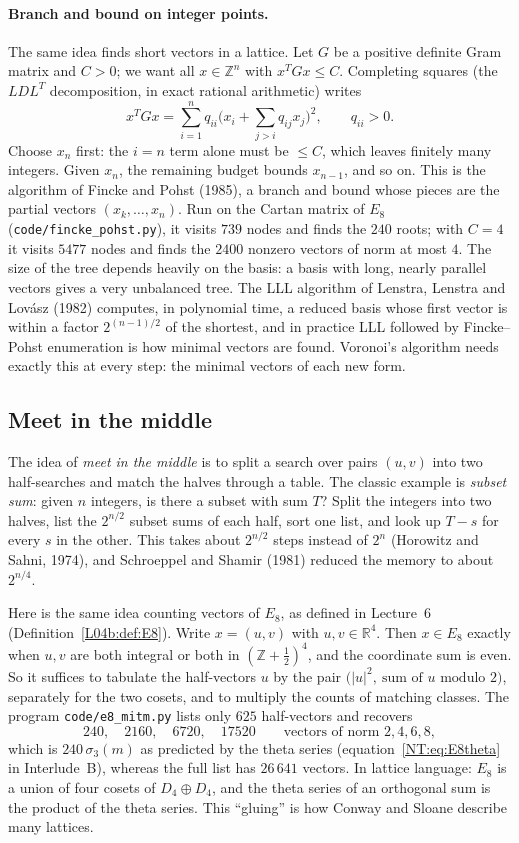\documentclass[11pt,openany]{book}
\theoremstyle{plain}
\theoremstyle{definition}
\theoremstyle{remark}
\newcommand{\R}{\mathbb{R}}
\newcommand{\Z}{\mathbb{Z}}
\newcommand{\abs}[1]{\left\lvert #1 \right\rvert}
\begin{document}
\paragraph{Branch and bound on integer points.} The same idea finds short vectors in a lattice. Let $G$ be
a positive definite Gram matrix and $C>0$; we want all $x\in\Z^n$ with $x^TGx\le C$. Completing squares
(the $LDL^T$ decomposition, in exact rational arithmetic) writes
\[
  x^TGx=\sum_{i=1}^nq_{ii}\Big(x_i+\sum_{j>i}q_{ij}x_j\Big)^2,\qquad q_{ii}>0 .
\]
Choose $x_n$ first: the $i=n$ term alone must be $\le C$, which leaves finitely many integers. Given
$x_n$, the remaining budget bounds $x_{n-1}$, and so on. This is the algorithm of Fincke and Pohst
(1985), a branch and bound whose pieces are the partial vectors $(x_k,\dots,x_n)$. Run on the Cartan
matrix of $E_8$ (\texttt{code/fincke\_pohst.py}), it visits $739$ nodes and finds the $240$ roots; with
$C=4$ it visits $5477$ nodes and finds the $2400$ nonzero vectors of norm at most $4$. The size of the
tree depends heavily on the basis: a basis with long, nearly parallel vectors gives a very unbalanced
tree. The LLL algorithm of Lenstra, Lenstra and Lov\'asz (1982) computes, in polynomial time, a reduced
basis whose first vector is within a factor $2^{(n-1)/2}$ of the shortest, and in practice LLL followed by
Fincke--Pohst enumeration is how minimal vectors are found. Voronoi's algorithm needs exactly this at
every step: the minimal vectors of each new form.

\subsection{Meet in the middle}
The idea of \emph{meet in the middle} is to split a search over pairs $(u,v)$ into two half-searches and
match the halves through a table. The classic example is \emph{subset sum}: given $n$ integers, is there
a subset with sum $T$? Split the integers into two halves, list the $2^{n/2}$ subset sums of each half, sort
one list, and look up $T-s$ for every $s$ in the other. This takes about $2^{n/2}$ steps instead of $2^n$
(Horowitz and Sahni, 1974), and Schroeppel and Shamir (1981) reduced the memory to about $2^{n/4}$.

Here is the same idea counting vectors of $E_8$, as defined in Lecture~6
(Definition~\ref{L04b:def:E8}). Write $x=(u,v)$ with $u,v\in\R^4$. Then $x\in E_8$ exactly when $u,v$ are
both integral or both in $(\Z+\frac12)^4$, and the coordinate sum is even. So it suffices to tabulate the
half-vectors $u$ by the pair $\big(\abs u^2,\ \text{sum of $u$ modulo }2\big)$, separately for the two
cosets, and to multiply the counts of matching classes. The program \texttt{code/e8\_mitm.py} lists only
$625$ half-vectors and recovers
\[
  240,\quad 2160,\quad 6720,\quad 17520\qquad\text{vectors of norm }2,4,6,8,
\]
which is $240\,\sigma_3(m)$ as predicted by the theta series (equation~\eqref{NT:eq:E8theta} in
Interlude~B), whereas the full list has $26\,641$ vectors. In lattice language: $E_8$ is a union of four cosets of
$D_4\oplus D_4$, and the theta series of an orthogonal sum is the product of the theta series. This
``gluing'' is how Conway and Sloane describe many lattices.
\end{document}

